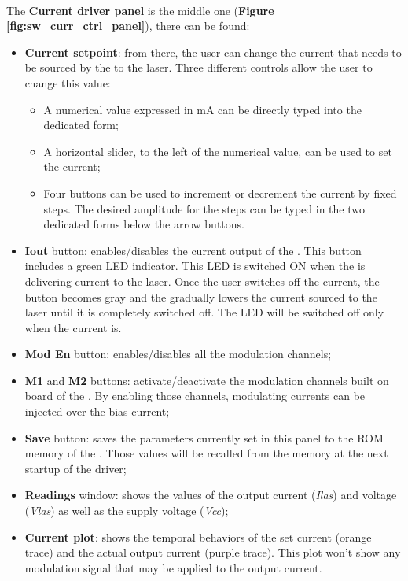 \paragraph{} The \textbf{Current driver panel} is the middle one (\textbf{Figure \ref{fig:sw_curr_ctrl_panel}}), there can be found:
    \begin{itemize}
        \item \textbf{Current setpoint}: from there, the user can change the current that needs to be sourced by the \QubeModel  to the laser. Three different controls allow the user to change this value:
        \begin{itemize}
            \item A numerical value expressed in mA can be directly typed into the dedicated form;
            \item A horizontal slider, to the left of the numerical value, can be used to set the current;
            \item Four buttons can be used to increment or decrement the current by fixed steps. The desired amplitude for the steps can be typed in the two dedicated forms below the arrow buttons.
        \end{itemize}
       
       \item \textbf{Iout} button: enables/disables the current output of the \QubeModel .
        \newline This button includes a green LED indicator. This LED is switched ON when the \QubeModel  is delivering current to the laser. Once the user switches off the current, the button becomes gray and the \QubeModel  gradually lowers the current sourced to the laser until it is completely switched off. The LED will be switched off only when the current is.
       
        \item \textbf{Mod En} button: enables/disables all the modulation channels;
        
        \item \textbf{M1} and \textbf{M2} buttons: activate/deactivate the modulation channels built on board of the \QubeModel . By enabling those channels, modulating currents can be injected over the bias current;
      
        \item \textbf{Save} button: saves the parameters currently set in this panel to the ROM memory of the \QubeModel . Those values will be recalled from the memory at the next startup of the \QubeModel  driver;
      
        \item \textbf{Readings} window: shows the values of the output current (\textit{Ilas}) and voltage (\textit{Vlas}) as well as the supply voltage (\textit{Vcc});
      
        \item \textbf{Current plot}: shows the temporal behaviors of the set current (orange trace) and the actual output current (purple trace). This plot won't show any modulation signal that may be applied to the output current.
    \end{itemize}
